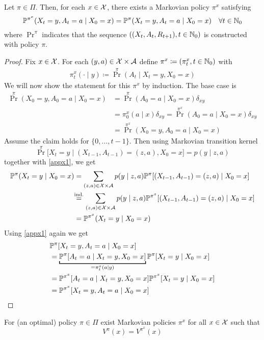 \begin{prop}[Puterman]
	Let \(\pi\in\Pi\). Then, for each \(x\in\mathcal{X}\), there exists a Markovian policy \(\pi^{x}\) satisfying
	\[\mathbb{P}^{\pi^x}(X_t=y,A_t=a\mid X_0=x)=\mathbb{P}^\pi(X_t=y,A_t=a\mid X_0=x)\quad \forall t\in\mathbb{N}_0 \]
	where \(\Pr^\pi\) indicates that the sequence 
	\(((X_t, A_t, R_{t+1}),t\in\mathbb{N}_0 )\) is constructed with policy \(\pi\).
\end{prop}
\begin{proof}
	Fix \(x\in\mathcal{X}\). For each \((y,a)\in\mathcal{X}\times\mathcal{A}\) define \(\pi^x\coloneqq (\pi^x_t,t\in\mathbb{N}_0)\) with
 	\begin{align}
			\pi^x_t(\cdot\mid y)\coloneqq \Pr^\pi (A_t \mid X_t=y,X_0=x)
	\end{align}
	We will now show the statement for this \(\pi^x\) by induction. The base case is
	\begin{align*}
		\Pr^\pi(X_0=y,A_0=a\mid X_0=x) 
		&= \Pr^\pi(A_0=a\mid X_0=x)\delta_{xy}\\
		&=\pi^x_0(a\mid x)\delta_{xy} 
		= \Pr^{\pi^x}(A_0=a\mid X_0=x)\delta_{xy}\\
		&=\Pr^{\pi^x}(X_0=y, A_0=a\mid X_0=x)
	\end{align*}
	Assume the claim holds for \(\{0,\dots, t-1\}\). Then using Markovian transition kernel
	\[\Pr^\pi\big[X_t=y\mid (X_{t-1},A_{t-1})=(z,a), X_0=x\big]=p(y\mid z,a)\]
	together with \ref{appx1}, we get
	\begin{align*}
		\Pr^\pi(X_t=y\mid X_0=x)
		&=\sum_{(z,a)\in\cX\times\cA}p(y\mid z,a)
		\Pr^\pi[(X_{t-1},A_{t-1})=(z,a)\mid X_0=x]\\
		&\lxeq{\text{ind.}} \sum_{(z,a)\in\cX\times\cA}p(y\mid z,a)
		\Pr^{\pi^x}[(X_{t-1},A_{t-1})=(z,a)\mid X_0=x]\\
		&=\Pr^{\pi^x}(X_t=y\mid X_0=x)
	\end{align*}
	Using \ref{appx1} again we get
	\begin{align*}
		&\Pr^{\pi}[X_t=y, A_t=a \mid X_0=x]\\
		&=\underbracket[1pt]{\Pr^\pi[A_t=a \mid X_t=y, X_0=x]}_{=\pi^x_t(a\mid y)}
		\Pr^\pi[X_t=y\mid X_0=x]\\
		&=\Pr^{\pi^x}[A_t=a \mid X_t=y, X_0=x]\Pr^{\pi^x}[X_t=y\mid X_0=x]\\
		&=\Pr^{\pi^x}[X_t=y, A_t=a \mid X_0=x]\qedhere
	\end{align*}
\end{proof}
\begin{corollary}[Puterman]
	For (an optimal) policy \(\pi\in\Pi\) exist Markovian policies \(\pi^x\) for all \(x\in\mathcal{X}\) such that
	\[
		V^\pi(x)=V^{\pi^x}(x)	
	\]
\end{corollary}
